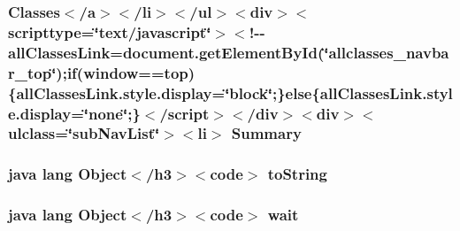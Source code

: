 \hypertarget{_r_8attr_8html_ac7ec81c51b614583af8456708f867848}{
\subsubsection[{Summary}]{\setlength{\rightskip}{0pt plus 5cm}Classes$<$/{\bf a}$>$$<$/li$>$$<$/ul$>$$<$div$>$$<$scripttype=\char`\"{}text/javascript\char`\"{}$>$$<$!-\/-\/all\-Classes\-Link=document.\-get\-Element\-By\-Id(\char`\"{}allclasses\-\_\-navbar\-\_\-top\char`\"{});if(window==top)\{all\-Classes\-Link.\-style.\-display=\char`\"{}block\char`\"{};\}else\{all\-Classes\-Link.\-style.\-display=\char`\"{}none\char`\"{};\}$<$/script$>$$<$/div$>$$<$div$>$$<$ulclass=\char`\"{}sub\-Nav\-List\char`\"{}$>$$<$li$>$ Summary}}\label{_r_8attr_8html_ac7ec81c51b614583af8456708f867848}
\hypertarget{_r_8attr_8html_a36e8a76a4132c9a7081416f27d087615}{
\subsubsection[{to\-String}]{\setlength{\rightskip}{0pt plus 5cm}java lang Object$<$/h3$>$$<$code$>$ to\-String}}\label{_r_8attr_8html_a36e8a76a4132c9a7081416f27d087615}
\hypertarget{_r_8attr_8html_a9a9f0c22e5688d478c707f910f1c1aea}{
\subsubsection[{wait}]{\setlength{\rightskip}{0pt plus 5cm}java lang Object$<$/h3$>$$<$code$>$ wait}}\label{_r_8attr_8html_a9a9f0c22e5688d478c707f910f1c1aea}
